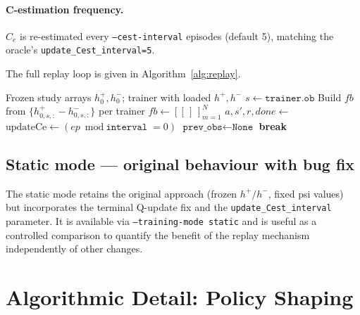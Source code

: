 \documentclass[11pt, a4paper]{article}
\begin{document}
\paragraph{C-estimation frequency.}
$C_e$ is re-estimated every \texttt{--cest-interval} episodes (default 5),
matching the oracle's \texttt{update\_Cest\_interval=5}.

The full replay loop is given in Algorithm~\ref{alg:replay}.

\begin{algorithm}[H]
\caption{Replay training loop (\texttt{train\_with\_human\_replay})}
\label{alg:replay}
\begin{algorithmic}[1]
\Require Frozen study arrays $h^+_0, h^-_0$; trainer with loaded $h^+, h^-$
  \State {}
    \State $s \gets \texttt{trainer.ob}$
      \State Build $fb$ from $\{h^+_{0,s,:} - h^-_{0,s,:}\}$ per trainer
    \Else
      \State $fb \gets [[\,]\,]_{m=1}^{N}$
    \EndIf
    \State $a, s', r, done \gets$ 
      \State $\text{updateCe} \gets (ep \bmod \texttt{interval} = 0)$
      \State {}
      \State $\texttt{prev\_obs} \gets \texttt{None}$
      \State \textbf{break}
    \EndIf
  \EndFor
\EndFor
\end{algorithmic}
\end{algorithm}

\subsection{Static mode — original behaviour with bug fix}

The static mode retains the original approach (frozen $h^+/h^-$, fixed psi
values) but incorporates the terminal Q-update fix and the
\texttt{update\_Cest\_interval} parameter.  It is available via
\texttt{--training-mode static} and is useful as a controlled comparison to
quantify the benefit of the replay mechanism independently of other changes.

\section{Algorithmic Detail: Policy Shaping}
\label{sec:policy_shaping}
\end{document}
